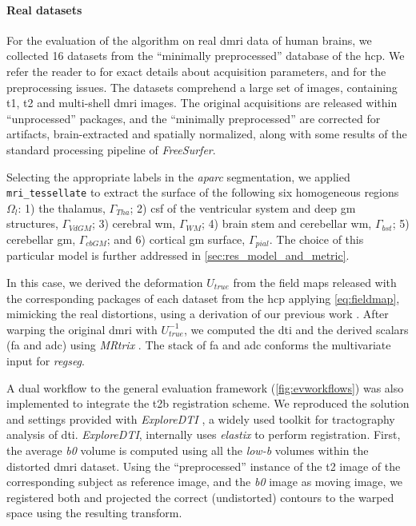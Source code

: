 \paragraph*{Real datasets} %
\label{sec:human_connectome}
%
For the evaluation of the algorithm on real \gls*{dmri} data of human brains,
  we collected 16 datasets from the ``minimally preprocessed''
	 database of the \gls*{hcp}.
We refer the reader to \citep{essen_human_2012} for exact details about acquisition
  parameters, and \citep{glasser_minimal_2013} for the preprocessing issues.
The datasets comprehend a large set of images, containing \gls*{t1}, \gls*{t2} and
  multi-shell \gls*{dmri} images.
The original acquisitions are released within ``unprocessed'' packages, and
  the ``minimally preprocessed'' are corrected for artifacts, brain-extracted
  and spatially normalized, along with some results of the standard processing
  pipeline of \emph{FreeSurfer}.

Selecting the appropriate labels in the \emph{aparc} segmentation, we applied
  \texttt{mri\_tessellate} to extract the surface of the following
  six homogeneous regions $\Omega_l$:
  1) the thalamus, $\Gamma_{Tha}$;
  2) \gls*{csf} of the ventricular system and deep \gls*{gm} structures, $\Gamma_{VdGM}$;
  3) cerebral \gls*{wm}, $\Gamma_{WM}$;
  4) brain stem and cerebellar \gls*{wm}, $\Gamma_{bst}$;
	5) cerebellar \gls*{gm}, $\Gamma_{cbGM}$; and
	6) cortical \gls*{gm} surface, $\Gamma_{pial}$.
The choice of this particular model is further addressed in \autoref{sec:res_model_and_metric}.

In this case, we derived the deformation $U_{true}$ from the field maps released with
  the corresponding packages of each dataset from the \gls*{hcp} applying \eqref{eq:fieldmap},
  mimicking the real distortions, using a derivation of our previous work
  \citep{esteban_simulationbased_2014}.
After warping the original \gls*{dmri} with $U_{true}^{-1}$, we computed the \gls*{dti} and
  the derived scalars (\gls*{fa} and \gls*{adc}) using \emph{MRtrix} \citep{tournier_mrtrix_2012}.
The stack of \gls*{fa} and \gls*{adc} conforms the multivariate input for \emph{regseg}.

A dual workflow to the general evaluation framework (\autoref{fig:evworkflows})
  was also implemented to integrate the \gls*{t2b} registration scheme.
We reproduced the solution and settings provided with \emph{ExploreDTI}
  \citep{leemans_exploredti_2009}, a widely used toolkit for tractography analysis of
  \gls*{dti}.
\emph{ExploreDTI}, internally uses \emph{elastix} \citep{klein_elastix_2010} to
  perform registration.
First, the average \emph{b0} volume is computed using all the \emph{low-b} volumes within
  the distorted \gls*{dmri} dataset.
Using the ``preprocessed'' instance of the \gls*{t2} image of the corresponding subject as
  reference image, and the \emph{b0} image as moving image, we registered both and
  projected the correct (undistorted) contours to the warped space using the resulting
  transform.